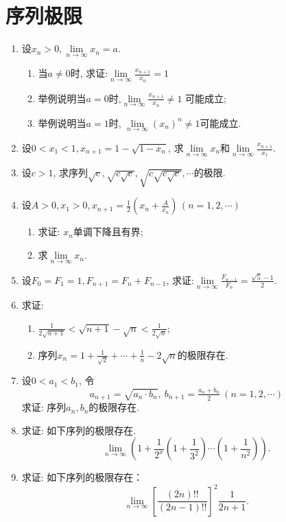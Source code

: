 \section{序列极限}
\begin{enumerate}
	\item 设$x_n>0, \lim\limits_{n\rightarrow \infty}x_n=a$.
	\begin{enumerate}
		\item 当$a\ne 0$时, 求证:$\lim\limits_{n \rightarrow \infty}\frac{x_{n+1}}{x_{n}}=1$
		\item 举例说明当$a=0$时,$\lim\limits_{n \rightarrow \infty}\frac{x_{n+1}}{x_{n}} \ne 1$ 可能成立;
		\item 举例说明当$a=1$时, $\lim\limits_{n \rightarrow \infty}(x_n)^n\ne 1$可能成立.
	\end{enumerate}
	\item 设$0<x_1<1, x_{n+1}=1-\sqrt{1-x_n}$, 求$\lim\limits_{n \rightarrow \infty}x_n$和$\lim\limits_{n\rightarrow \infty}\frac{x_{n+1}}{x_1}$. 
	\item 设$c>1$, 求序列$\sqrt{c}, \sqrt{c\sqrt{c}},\sqrt{c\sqrt{c\sqrt{c}}},\cdots$的极限.
	\item 设$A>0,x_1>0,x_{n+1}=\frac{1}{2}(x_n+\frac{A}{x_n})\,(n=1,2,\cdots)$
	\begin{enumerate}
		\item 求证: $x_n$单调下降且有界;
		\item 求$\lim\limits_{n\rightarrow \infty}x_n$.
	\end{enumerate}
	\item 设$F_0=F_1=1,F_{n+1}=F_n+F_{n-1}$, 求证:$\lim\limits_{n\rightarrow \infty}\tfrac{F_{n-1}}{F_n}=\frac{\sqrt{5}-1}{2}$.
	\item 求证:
	\begin{enumerate}
		\item $\frac{1}{2\sqrt{n+1}}<\sqrt{n+1}-\sqrt{n}<\frac{1}{2\sqrt{n}}$;
		\item 序列$x_n=1+\frac{1}{\sqrt{2}}+\cdots+\frac{1}{n}-2\sqrt{n}$的极限存在.
	\end{enumerate}
	\item 设$0<a_1<b_1$, 令
	$$
		a_{n+1} = \sqrt{a_n\cdot b_n},\ b_{n+1}=\tfrac{a_n+b_n}{2}\ (n=1,2,\cdots)
	$$求证: 序列${a_n},{b_n}的极限存在$.
	\item 求证: 如下序列的极限存在.
	$$
	\lim\limits_{n\rightarrow \infty}(1+\frac{1}{2^x}(1+\frac{1}{3^2})\cdots(1+\frac{1}{n^2})).
	$$
	\item 求证: 如下序列的极限存在：
	$$
	\lim\limits_{n\rightarrow \infty} \left[\frac{(2n)!!}{(2n-1)!!}\right]^2\frac{1}{2n+1}.
$$
\end{enumerate}
